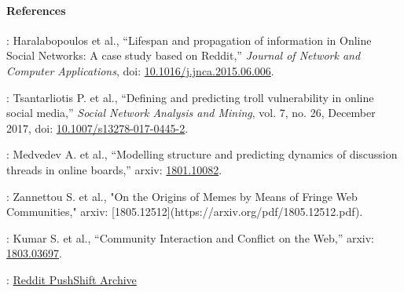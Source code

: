 \paragraph{References}
: Haralabopoulos et al., ``Lifespan and propagation of information in Online Social Networks: A case study based on Reddit,'' \emph{Journal of Network and Computer Applications}, doi: \href{https://doi.org/10.1016/j.jnca.2015.06.006}{10.1016/j.jnca.2015.06.006}.

: Tsantarliotis P. et al., ``Defining and predicting troll vulnerability in online social media,'' \emph{Social Network Analysis and Mining}, vol. 7, no. 26, December 2017, doi: \href{https://doi.org/10.1007/s13278-017-0445-2}{10.1007/s13278-017-0445-2}.

: Medvedev A. et al., ``Modelling structure and predicting dynamics of discussion threads in online boards,'' arxiv: \href{https://arxiv.org/pdf/1801.10082.pdf}{1801.10082}.

: Zannettou S. et al., "On the Origins of Memes by Means of Fringe Web Communities," arxiv: [1805.12512](https://arxiv.org/pdf/1805.12512.pdf).

: Kumar S. et al., ``Community Interaction and Conflict on the Web,'' arxiv: \href{https://arxiv.org/pdf/1803.03697.pdf}{1803.03697}.

: \href{https://files.pushshift.io/reddit/}{Reddit PushShift Archive}
